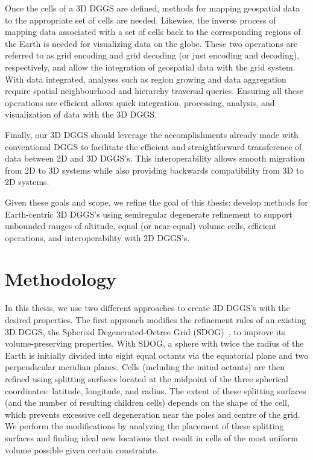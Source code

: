 Once the cells of a 3D DGGS are defined, methods for mapping geospatial data to the appropriate set of cells are needed.
Likewise, the inverse process of mapping data associated with a set of cells back to the corresponding regions of the Earth is needed for visualizing data on the globe.
These two operations are referred to as grid encoding and grid decoding (or just encoding and decoding), respectively, and allow the integration of geospatial data with the grid system.
With data integrated, analyses such as region growing and data aggregation require spatial neighbourhood and hierarchy traversal queries.
Ensuring all these operations are efficient allows quick integration, processing, analysis, and visualization of data with the 3D DGGS.


Finally, our 3D DGGS should leverage the accomplishments already made with conventional DGGS to facilitate the efficient and straightforward transference of data between 2D and 3D DGGS's. This interoperability allows smooth migration from 2D to 3D systems while also providing backwards compatibility from 3D to 2D systems.


Given these goals and scope, we refine the goal of this thesis: develop methods for Earth-centric 3D DGGS's using semiregular degenerate refinement to support unbounded ranges of altitude, equal (or near-equal) volume cells, efficient operations, and interoperability with 2D DGGS's.


\section{Methodology} \label{chap:1:method}
In this thesis, we use two different approaches to create 3D DGGS's with the desired properties.
The first approach modifies the refinement rules of an existing 3D DGGS, the Spheroid Degenerated-Octree Grid (SDOG)~\cite{yu2009sdog}, to improve its volume-preserving properties.
With SDOG, a sphere with twice the radius of the Earth is initially divided into eight equal octants via the equatorial plane and two perpendicular meridian planes.
Cells (including the initial octants) are then refined using splitting surfaces located at the midpoint of the three spherical coordinates: latitude, longitude, and radius.
The extent of these splitting surfaces (and the number of resulting children cells) depends on the shape of the cell, which prevents excessive cell degeneration near the poles and centre of the grid.
We perform the modifications by analyzing the placement of these splitting surfaces and finding ideal new locations that result in cells of the most uniform volume possible given certain constraints.


